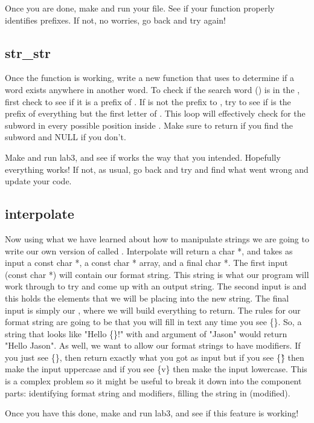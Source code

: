 \documentclass{tufte-handout}
\begin{document}
Once you are done, make and run your file. See if your function properly identifies prefixes. If not, no worries, go back and try again!

\subsection{str\_str}

Once the function  is working, write a new
function  that uses  to determine if a word exists anywhere in another word. To check if the search word () is in the , first check to see if it is a prefix of . If  is not the prefix to , try to see if  is the prefix of everything but the first letter of . This loop will effectively check for the subword  in every possible position inside . Make sure to return  if you find the subword and NULL if you don't.

Make and run lab3, and see if  works the way that you intended.  Hopefully everything works!  If not, as usual, go back and try and find what went wrong and update your code.

\subsection{interpolate}

Now using what we have learned about how to manipulate strings we are
going to write our own version of  called
. Interpolate will return a char *, and takes
as input a const char *, a const char * array, and a final char *. The
first input (const char *)  will contain our format
string. This string is what our program will work through to try and
come up with an output string. The second input is  and
this holds the elements that we will be placing into the new string. The
final input is simply our , where we will build
everything to return. The rules for our format string are going to be
that you will fill in text any time you see \{\}. So, a string that
looks like "Hello \{\}!" with and argument of "Jason" would return
"Hello Jason". As well, we want to allow our format strings to have
modifiers. If you just see \{\}, then return exactly what you got as
input but if you see \{\^\} then make the input uppercase and if you see
\{v\} then make the input lowercase. This is a complex problem so it might be useful to break it down into the component parts: identifying format string and modifiers, filling the string in (modified).

Once you have this done, make and run lab3, and see if this feature is working!
\end{document}
